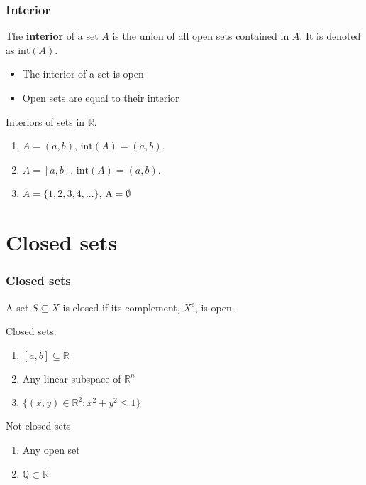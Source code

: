 \documentclass[compress]{beamer}
\def\R{\mathbb{R}}
\begin{document}
\begin{frame} 
  \frametitle{Interior}
  \begin{definition}
    The \textbf{interior} of a set $A$ is the union of all open sets
    contained in $A$. It is denoted as $\mathrm{int}(A)$.
  \end{definition}
  \begin{itemize}
  \item The interior of a set is open
  \item Open sets are equal to their interior
  \end{itemize}
  \begin{example}
    Interiors of sets in $\R$.
    \begin{enumerate}
    \item $A = (a,b)$, $\mathrm{int}(A) = (a,b)$.
    \item $A = [a,b]$, $\mathrm{int}(A) = (a,b)$.
    \item $A = \{1, 2, 3, 4, ... \}$, $\mathrm{A} = \emptyset$
    \end{enumerate}  
  \end{example}
\end{frame}

\section{Closed sets}

\begin{frame}
  \frametitle{Closed sets}
  \begin{definition}
    A set $S \subseteq X$ is closed if its complement, $X^c$, is open. 
  \end{definition}
  \begin{example}
    Closed sets:
    \begin{enumerate}
    \item $[a,b] \subseteq \R$
    \item Any linear subspace of $\R^n$
    \item $\{(x,y) \in \R^2: x^2 + y^2 \leq 1\}$
    \end{enumerate}
    Not closed sets
    \begin{enumerate}
    \item Any open set
    \item $\mathbb{Q} \subset \R$
    \end{enumerate}
  \end{example}
\end{frame}
\end{document}
